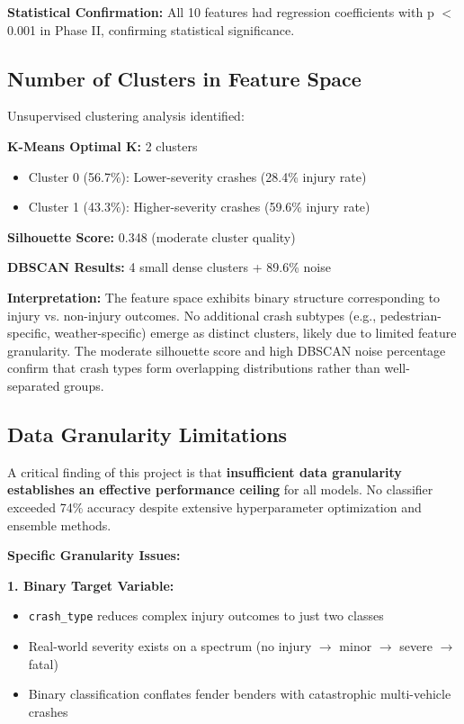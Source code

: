 \documentclass[12pt,man]{apa7}
\begin{document}
\textbf{Statistical Confirmation:} All 10 features had regression coefficients with p $<$ 0.001 in Phase II, confirming statistical significance.

\subsection{Number of Clusters in Feature Space}

Unsupervised clustering analysis identified:

\textbf{K-Means Optimal K:} 2 clusters
\begin{itemize}
    \item Cluster 0 (56.7\%): Lower-severity crashes (28.4\% injury rate)
    \item Cluster 1 (43.3\%): Higher-severity crashes (59.6\% injury rate)
\end{itemize}

\textbf{Silhouette Score:} 0.348 (moderate cluster quality)

\textbf{DBSCAN Results:} 4 small dense clusters + 89.6\% noise

\textbf{Interpretation:} The feature space exhibits binary structure corresponding to injury vs. non-injury outcomes. No additional crash subtypes (e.g., pedestrian-specific, weather-specific) emerge as distinct clusters, likely due to limited feature granularity. The moderate silhouette score and high DBSCAN noise percentage confirm that crash types form overlapping distributions rather than well-separated groups.

\subsection{Data Granularity Limitations}

A critical finding of this project is that \textbf{insufficient data granularity establishes an effective performance ceiling} for all models. No classifier exceeded 74\% accuracy despite extensive hyperparameter optimization and ensemble methods.

\textbf{Specific Granularity Issues:}

\textbf{1. Binary Target Variable:}
\begin{itemize}
    \item \texttt{crash\_type} reduces complex injury outcomes to just two classes
    \item Real-world severity exists on a spectrum (no injury $\rightarrow$ minor $\rightarrow$ severe $\rightarrow$ fatal)
    \item Binary classification conflates fender benders with catastrophic multi-vehicle crashes
\end{itemize}
\end{document}
